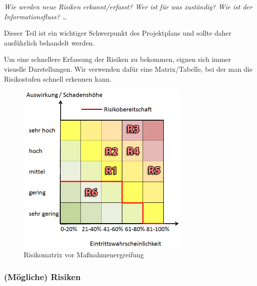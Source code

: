 \documentclass[fontsize=12pt,paper=a4,twoside]{scrartcl}
\begin{document}
{\em Wie werden neue Risiken erkannt/erfasst? Wer ist für was
  zuständig? Wie ist der Informationsfluss? \ldots 

Dieser Teil ist ein
  wichtiger Schwerpunkt des Projektplans und sollte daher ausführlich
  behandelt werden.}

Um eine schnellere Erfassung der Risiken zu bekommen, eignen sich immer visuelle Darstellungen. Wir verwenden dafür eine Matrix/Tabelle, bei der man die Risikostufen schnell erkennen kann.\\

\begin{figure}[H]
	\centering
	\includegraphics[width=0.75\textwidth]{src/risikomatrix_before.png}
	\caption{Risikomatrix vor Maßnahmenergreifung}
	\label{fig:matrixtable_before}
\end{figure}

\subsubsection{(Mögliche) Risiken}
\end{document}
